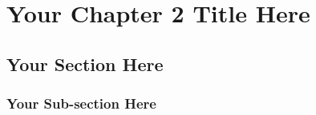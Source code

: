 \label{04.labreport2}
\chapter{Your Chapter 2 Title Here}
\section{Your Section Here}
\subsection{Your Sub-section Here}